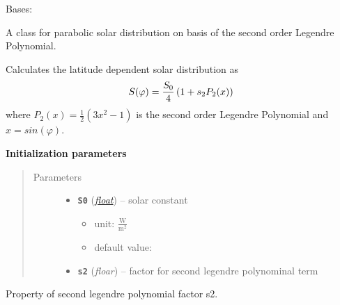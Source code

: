 \documentclass[letterpaper,10pt,english]{sphinxmanual}
\begin{document}
\begin{fulllineitems}
\label{api/climlab.radiation:climlab.radiation.insolation.P2Insolation}
Bases: {\hyperref[api/climlab.radiation:climlab.radiation.insolation._Insolation]{\emph{}}}

A class for parabolic solar distribution on basis of the second order
Legendre Polynomial.

Calculates the latitude dependent solar distribution as
\begin{gather}
\begin{split}S(\varphi) = \frac{S_0}{4} \left( 1 + s_2 P_2(x) \right)\end{split}\notag
\end{gather}
where \(P_2(x) = \frac{1}{2} (3x^2 - 1)\) is the second order Legendre Polynomial
and \(x=sin(\varphi)\).

\textbf{Initialization parameters}
\begin{quote}\begin{description}
\item[{Parameters}] \leavevmode\begin{itemize}
\item {} 
\textbf{\texttt{S0}} (\href{http://docs.python.org/2.7/library/functions.html\#float}{\emph{float}}) -- 
solar constant
\begin{itemize}
\item {} 
unit: \(\frac{\textrm{W}}{\textrm{m}^2}\)

\item {} 
default value: 

\end{itemize}


\item {} 
\textbf{\texttt{s2}} (\emph{floar}) -- factor for second legendre polynominal term

\end{itemize}

\end{description}\end{quote}

\begin{fulllineitems}
\label{api/climlab.radiation:climlab.radiation.insolation.P2Insolation.s2}
Property of second legendre polynomial factor s2.


\end{fulllineitems}
\end{fulllineitems}
\end{document}
